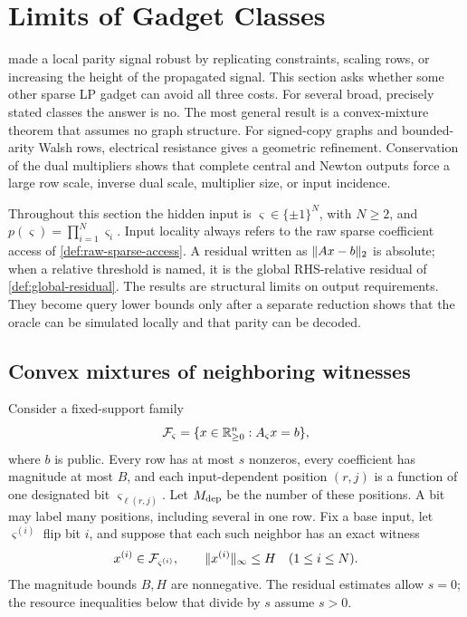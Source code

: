 \section{Limits of Gadget Classes}
\label{sec:gadget-frontiers}

 made a local parity signal robust by
replicating constraints, scaling rows, or increasing the height of the
propagated signal.  This section asks whether some other sparse LP gadget
can avoid all three costs.  For several broad, precisely stated classes the
answer is no.  The most general result is a convex-mixture theorem that
assumes no graph structure.  For signed-copy graphs and bounded-arity Walsh
rows, electrical resistance gives a geometric refinement.  Conservation of
the dual multipliers shows that complete central and Newton outputs force a
large row scale, inverse dual scale, multiplier size, or input incidence.

Throughout this section the hidden input is
\(\varsigma\in\{\pm1\}^N\), with \(N\geq2\), and
\(p(\varsigma)=\prod_{i=1}^N\varsigma_i\).  Input locality always refers to
the raw sparse coefficient access of \cref{def:raw-sparse-access}.
A residual written as \(\lVert Ax-b\rVert_2\) is absolute; when a relative
threshold is named, it is the global RHS-relative residual of
\cref{def:global-residual}.  The results are structural limits on
output requirements.  They become query lower bounds only after a separate
reduction shows that the oracle can be simulated locally and that parity can
be decoded.

\subsection{Convex mixtures of neighboring witnesses}
\label{sec:frontier-mixture}

Consider a fixed-support family
\begin{equation}
 \mathcal F_{\varsigma}
 =\{x\in\mathbb{R}_{\geq0}^n:A_{\varsigma}x=b\},
 \label{eq:frontier-local-family}
\end{equation}
where \(b\) is public.  Every row has at most \(s\) nonzeros, every
coefficient has magnitude at most \(B\), and each input-dependent position
\((r,j)\) is a function of one designated bit
\(\varsigma_{\ell(r,j)}\).  Let \(M_{\rm dep}\) be the number of these
positions.  A bit may label many positions, including several in one row.
Fix a base input, let \(\varsigma^{(i)}\) flip bit \(i\), and suppose that
each such neighbor has an exact witness
\begin{equation}
 x^{(i)}\in\mathcal F_{\varsigma^{(i)}},
 \qquad \lVert x^{(i)}\rVert_\infty\leq H
 \quad(1\leq i\leq N).
 \label{eq:frontier-neighbor-witnesses}
\end{equation}
The magnitude bounds \(B,H\) are nonnegative.  The residual estimates
allow \(s=0\); the resource inequalities below that divide by \(s\) assume
\(s>0\).

